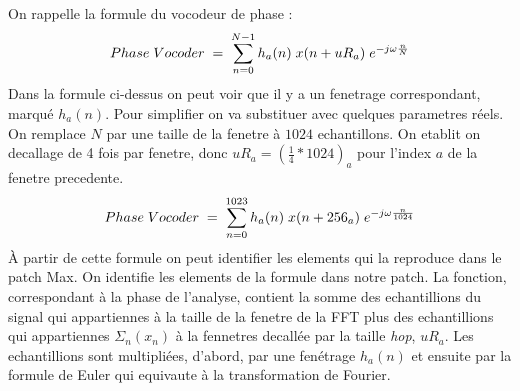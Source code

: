 On rappelle la formule du vocodeur de phase : 
    \begin{equation*}
    Phase \; Vocoder \; = \; \sum_{n=0} ^{N-1} h_a(n) \; x(n + uR_a) \; e^{-j \omega \frac{n}{N}} \vspace{0.5cm} 
    \end{equation*}
Dans la formule ci-dessus on peut voir que il y a un fenetrage correspondant, marqué $h_a(n)$. Pour simplifier on va substituer avec quelques parametres réels. On remplace $N$ par une taille de la fenetre à $1024$ echantillons. On etablit on decallage de 4 fois par fenetre, donc $uR_a = (\frac{1}{4} * 1024)_a$ pour l'index $a$ de la fenetre precedente. 
    \begin{equation*}
    Phase \; Vocoder \; = \; \sum_{n=0} ^{1023} h_a(n) \; x(n + 256_a) \; e^{-j \omega \frac{n}{1024}} \vspace{0.5cm} 
    \end{equation*}
À partir de cette formule on peut identifier les elements qui la reproduce dans le patch Max. On identifie les elements de la formule dans notre patch. La fonction, correspondant à la phase de l'analyse, contient la somme des echantillions du signal qui appartiennes à la taille de la fenetre de la FFT plus des echantillions qui appartiennes $\Sigma_n (x_n) $ à la fennetres decallée par la taille \textit{hop}, $uR_a$. Les echantillions sont multipliées, d'abord, par une fenétrage $h_a(n)$ et ensuite par la formule de Euler qui equivaute à la transformation de Fourier.

